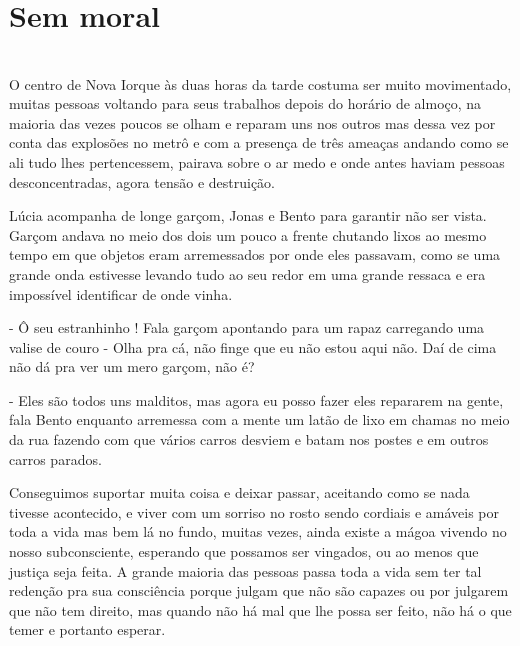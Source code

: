 
    


\newpage


\ifdefined\useChapters
\chapter{Sem moral}

\else
\chapter{}
\fi

O centro de Nova Iorque às duas horas da tarde costuma ser muito movimentado, muitas pessoas voltando para seus trabalhos depois do horário de almoço, na maioria das vezes poucos se olham e reparam uns nos outros mas dessa vez por conta das explosões no metrô e com a presença de três ameaças andando como se ali tudo lhes pertencessem, pairava sobre o ar medo e onde antes haviam pessoas desconcentradas, agora tensão e destruição.

Lúcia acompanha de longe garçom, Jonas e Bento para garantir não ser vista. Garçom andava no meio dos dois um pouco a frente chutando lixos ao mesmo tempo em que objetos eram arremessados por onde eles passavam, como se uma grande onda estivesse levando tudo ao seu redor em uma grande ressaca e era impossível identificar de onde vinha. 

- Ô seu estranhinho ! Fala garçom apontando para um rapaz carregando uma valise de couro - Olha pra cá, não finge que eu não estou aqui não. Daí de cima não dá pra ver um mero garçom, não é?

- Eles são todos uns malditos, mas agora eu posso fazer eles repararem na gente, fala Bento enquanto arremessa com a mente um latão de lixo em chamas no meio da rua fazendo com que vários carros desviem e batam nos postes e em outros carros parados.

Conseguimos suportar muita coisa e deixar passar, aceitando como se nada tivesse acontecido, e viver com um sorriso no rosto sendo cordiais e amáveis por toda a vida mas bem lá no fundo, muitas vezes, ainda existe a mágoa vivendo no nosso subconsciente, esperando que possamos ser vingados, ou ao menos que justiça seja feita. A grande maioria das pessoas passa toda a vida sem ter tal redenção pra sua consciência porque julgam que não são capazes ou por julgarem que não tem direito, mas quando não há mal que lhe possa ser feito, não há o que temer e portanto esperar.


